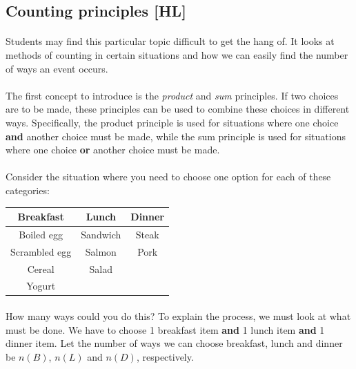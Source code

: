 \documentclass[12pt, a4paper, titlepage, twoside]{article}
\begin{document}
	\hfill
	
	\subsection{Counting principles [HL]}
	
	\paragraph{}
	Students may find this particular topic difficult to get the hang of. It looks at methods of counting in certain situations
	and how we can easily find the number of ways an event occurs.
	
	\paragraph{}
	The first concept to introduce is the \textit{product} and \textit{sum} principles. If two choices are to be made, 
	these principles can be used to combine these choices in different ways. Specifically, the product principle is used for
	situations where one choice \textbf{and} another choice must be made, while the sum principle is used for situations where
	one choice \textbf{or} another choice must be made.
	
	\paragraph{}
	Consider the situation where you need to choose one option for each of these categories:
	
	\begin{longtable}{|c|c|c|}
		\hline
		\textbf{Breakfast} & \textbf{Lunch} & \textbf{Dinner}\\
		\hline
		Boiled egg & Sandwich & Steak\\
		\hline
		Scrambled egg & Salmon & Pork\\
		\hline
		Cereal & Salad & \makecell{}\\
		\hline
		Yogurt & \makecell{} & \makecell{}\\
		\hline
	\end{longtable}
	
	\paragraph{}
	How many ways could you do this? To explain the process, we must look at what must be done.
	We have to choose 1 breakfast item \textbf{and} 1 lunch item \textbf{and} 1 dinner item.
	Let the number of ways we can choose breakfast, lunch and dinner be $n(B)$, $n(L)$ and $n(D)$, respectively.
	
\end{document}
